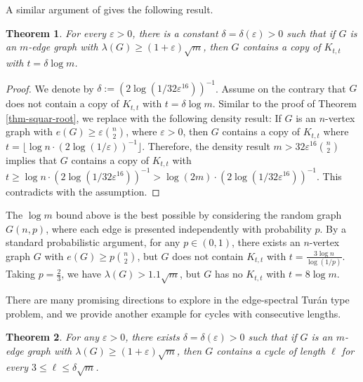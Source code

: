 \documentclass[11pt,a4paper]{article}
\newtheorem{theorem}{Theorem}[section]
\theoremstyle{definition}
\theoremstyle{remark}
\begin{document}
 
 A similar argument of  gives the following result.  
 
 \begin{theorem} \label{thm-log-m}
For every $\varepsilon >0$, 
there is a constant $\delta = \delta (\varepsilon) >0$ such that 
if $G$ is an $m$-edge graph with 
$\lambda (G)\ge (1+ \varepsilon )\sqrt{m}$, then $G$ contains a copy 
of $K_{t,t}$ with $t= \delta \log m$. 
\end{theorem} 

\begin{proof}
We denote by $\delta:=\left(2\log (1/32\varepsilon^{16}) \right)^{-1}$. 
Assume on the contrary that $G$ does not contain a copy of $K_{t,t}$ with $t=\delta \log m$. Similar to the proof of Theorem \ref{thm-squar-root}, we replace  with the following density result: 
If $G$ is an $n$-vertex graph with 
$ e(G)\ge \varepsilon {n \choose 2}$, where $\varepsilon >0$, 
 then $G$ contains a copy of $K_{t,t}$ where $t=\lfloor {\log n}\cdot \left({2 \log (1/ \varepsilon)} \right)^{-1} \rfloor$. Therefore, the density result 
 $m>32 \varepsilon^{16} {n \choose 2}$ implies that 
 $G$ contains 
    a copy of $K_{t,t}$ with $t\ge {\log n}\cdot (2\log (1/32\varepsilon^{16}) )^{-1}> 
    {\log (2m)} \cdot (2{\log (1/32\varepsilon^{16})} )^{-1}$. 
    This contradicts with the assumption. 
\end{proof}

The $\log m$ bound above is the best possible by considering the random graph $G(n, p)$, where each edge is presented independently with probability $p$. By a standard probabilistic argument, for any $p\in (0,1)$, there exists an $n$-vertex graph $G$ with $e(G)\ge p{n \choose 2}$, but $G$ does not contain $K_{t,t}$ with $t=\frac{3\log n}{\log (1/p)}$. Taking $p=\frac{2}{3}$, we have $\lambda (G) > 1.1 \sqrt{m}$, but $G$ has no $K_{t,t}$ with $t=8\log m$.  


\medskip 
There are many promising directions to explore in the edge-spectral Tur\'{a}n type problem, and we provide another example for cycles with consecutive lengths. 

\begin{theorem}
    For any $\varepsilon >0$, there exists $\delta = \delta (\varepsilon) >0$ such that if $G$ is an $m$-edge graph with $\lambda (G)\ge (1+ \varepsilon )\sqrt{m}$, then $G$ contains a cycle of length $\ell$ for every $3\le \ell \le \delta \sqrt{m}$. 
\end{theorem}
\end{document}

